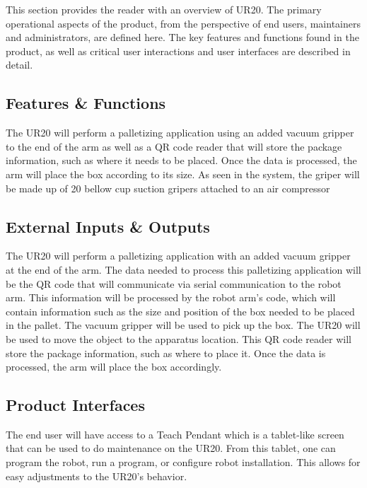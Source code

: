 This section provides the reader with an overview of UR20. The primary operational aspects of the product, from the perspective of end users, maintainers and administrators, are defined here. The key features and functions found in the product, as well as critical user interactions and user interfaces are described in detail.

\subsection{Features \& Functions}
The UR20 will perform a palletizing application using an added vacuum gripper to the end of the arm as well as a QR code reader that will store the package information, such as where it needs to be placed. Once the data is processed, the arm will place the box according to its size. As seen in the system, the griper will be made up of 20 bellow cup suction gripers  attached to an air compressor

\subsection{External Inputs \& Outputs}
The UR20 will perform a palletizing application with an added vacuum gripper at the end of the arm. The data needed to process this palletizing application will be the QR code that will communicate via serial communication to the robot arm. This information will be processed by the robot arm's code, which will contain information such as the size and position of the box needed to be placed in the pallet. The vacuum gripper will be used to pick up the box. The UR20 will be used to move the object to the apparatus location. This QR code reader will store the package information, such as where to place it. Once the data is processed, the arm will place the box accordingly. 

\subsection{Product Interfaces}
The end user will have access to a Teach Pendant which is a tablet-like screen that can be used to do maintenance on the UR20. From this tablet, one can program the robot, run a program, or configure robot installation. This allows for easy adjustments to the UR20's behavior.